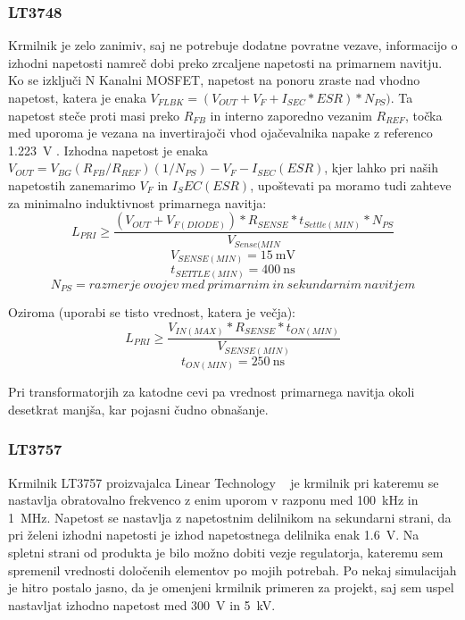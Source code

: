 \documentclass[a4paper,twoside,openright,12pt,Slovene]{book}
\begin{document}
	\subsubsection{LT3748} \label{LT3748}
Krmilnik je zelo zanimiv, saj ne potrebuje dodatne povratne vezave, informacijo o izhodni napetosti namreč dobi preko zrcaljene napetosti na primarnem navitju. Ko se izključi N Kanalni MOSFET, napetost na ponoru zraste nad vhodno napetost, katera je enaka \(V_{FLBK} = (V_{OUT} + V_F + I_{SEC} * ESR) * N_{PS}) \). Ta napetost steče proti masi preko \(R_{FB}\) in interno zaporedno vezanim \(R_{REF}\), točka med uporoma je vezana na invertirajoči vhod ojačevalnika napake z referenco \SI{1.223}{\volt} \cite{analog:LT3748}. Izhodna napetost je enaka \(V_{OUT} = V_{BG}(R_{FB} / R_{REF})(1 / N_{PS}) - V_F - I_{SEC} (ESR)\), kjer lahko pri naših napetostih zanemarimo \(V_F\) in \(I_SEC (ESR)\), upoštevati pa moramo tudi zahteve za minimalno induktivnost primarnega navitja:
\[L_{PRI} \geq \frac{(V_{OUT}+V_{F(DIODE)}) * R_{SENSE} * t_{Settle(MIN)} * N_{PS}}{V_{Sense(MIN}}\]
\[V_{SENSE(MIN)}=\SI{15}{\milli\volt}\]
\[t_{SETTLE(MIN)}=\SI{400}{\nano\second}\]
\[N_{PS}=razmerje \: ovojev \: med \: primarnim \: in \: sekundarnim \: navitjem \]

Oziroma (uporabi se tisto vrednost, katera je večja):
\[L_{PRI} \geq \frac{V_{IN(MAX)}*R_{SENSE}*t_{ON(MIN)}}{V_{SENSE(MIN)}}\]
\[t_{ON(MIN)}=\SI{250}{\nano\second}\]

Pri transformatorjih za katodne cevi pa vrednost primarnega navitja okoli desetkrat manjša, kar pojasni čudno obnašanje.

	\subsubsection{LT3757} \label{LT3757}
Krmilnik LT3757 proizvajalca Linear Technology ~\cite{analog:LT3757} je krmilnik pri kateremu se nastavlja obratovalno frekvenco z enim uporom v razponu med \SI{100} {\kilo\hertz} in \SI{1} {\mega\hertz}. Napetost se nastavlja z napetostnim delilnikom na sekundarni strani, da pri želeni izhodni napetosti je izhod napetostnega delilnika enak \SI{1.6} {\volt}. Na spletni strani od produkta je bilo možno dobiti vezje regulatorja, kateremu sem spremenil vrednosti določenih elementov po mojih potrebah. Po nekaj simulacijah je hitro postalo jasno, da je omenjeni krmilnik primeren za projekt, saj sem uspel nastavljat izhodno napetost med \SI{300}{\volt} in \SI{5}{\kilo\volt}. 
\end{document}
